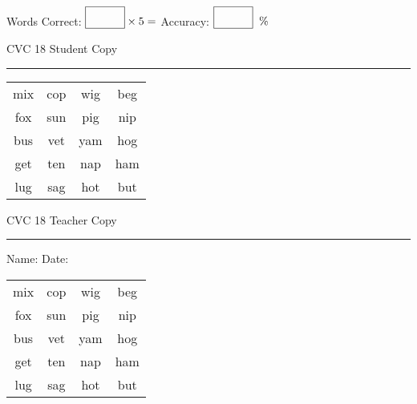 \documentclass{memoir}
\begin{document}
\normalsize

Words Correct: $\fbox{\phantom{\huge 100}} \times 5 = $ Accuracy: $\fbox{\phantom{\huge 100}}\;\; \%$ 

\vfill

\newpage


\footnotesize \noindent
CVC 18 \hfill Student Copy
\smallskip
\hrule

\huge

\setlength{\tabcolsep}{14pt}
\def\arraystretch{2}

{\selectfont


\begin{vplace}[0.5]
\begin{center}
\begin{tabular}{cccc}
mix & cop & wig & beg \\
fox & sun & pig & nip \\
bus & vet & yam & hog \\
get & ten & nap & ham \\
lug & sag & hot & but \\
\end{tabular}
\end{center}
\end{vplace}

}

\newpage

\footnotesize \noindent
CVC 18 \hfill Teacher Copy
\smallskip
\hrule

\normalsize

\vfill

\noindent
Name: \underline{\hspace{1.75in}} \hfill Date: \underline{\hspace{1in}}

\huge

{\selectfont


\begin{vplace}[0.5]
\begin{center}
\begin{tabular}{cccc}
mix & cop & wig & beg \\
fox & sun & pig & nip \\
bus & vet & yam & hog \\
get & ten & nap & ham \\
lug & sag & hot & but \\
\end{tabular}
\end{center}
\end{vplace}



}
\end{document}
